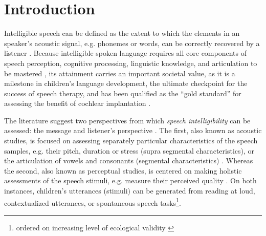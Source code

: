 \section{Introduction} \label{S:introduction}

Intelligible speech can be defined as the extent to which the elements in an speaker's acoustic signal, e.g. phonemes or words, can be correctly recovered by a listener \citep{Kent_et_al_1989, Whitehill_et_al_2004, vanHeuven_2008, Freeman_et_al_2017}. Because intelligible spoken language requires all core components of speech perception, cognitive processing, linguistic knowledge, and articulation to be mastered \citep{Freeman_et_al_2017}, its attainment carries an important societal value, as it is a milestone in children's language development, the ultimate checkpoint for the success of speech therapy, and has been qualified as the ``gold standard'' for assessing the benefit of cochlear implantation \citep{Chin_et_al_2012}. 

The literature suggest two perspectives from which \textit{speech intelligibility} can be assessed: the message and listener's perspective \citep{Boonen_et_al_2020, Boonen_et_al_2021}. The first, also known as acoustic studies, is focused on assessing separately particular characteristics of the speech samples, e.g. their pitch, duration or stress (supra segmental characteristics), or the articulation of vowels and consonants (segmental characteristics) \citep{Rowe_et_al_2018}. Whereas the second, also known as perceptual studies, is centered on making holistic assessments of the speech stimuli, e.g. measure their perceived quality \citep{Boonen_et_al_2020, Boonen_et_al_2021}. On both instances, children's utterances (stimuli) can be generated from reading at loud, contextualized utterances, or spontaneous speech tasks\footnote{ordered on increasing level of ecological validity \citep{Flipsen_2006,Ertmer_2011}}.

\begin{comment}
Based on their description, it seems that perceptual are more subjective than acoustic studies, as they do not rely on "objective" measurements, i.e. time duration, wave amplitude, among others, available in the former. However, for the case of SI, there are objective and subjective assessment methodologies.
\end{comment}

